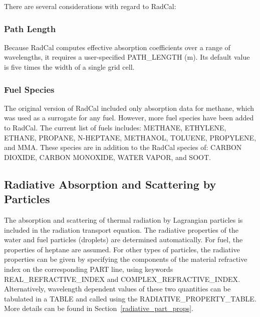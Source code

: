 \documentclass[11pt]{book}
\begin{document}
There are several considerations with regard to RadCal:

\subsubsection{Path Length}

Because RadCal computes effective absorption coefficients over a range of wavelengths, it requires a user-specified {\ct PATH\_LENGTH} (m).
Its default value is five times the width of a single grid cell.

\subsubsection{Fuel Species}

\label{info:RadCal_fuelspecies}

The original version of RadCal included only absorption data for methane, which was used as a surrogate for any fuel. However, more fuel species have been added to RadCal. The current list of fuels includes: {\ct METHANE}, {\ct ETHYLENE}, {\ct ETHANE}, {\ct PROPANE}, {\ct N-HEPTANE}, {\ct METHANOL}, {\ct TOLUENE}, {\ct PROPYLENE}, and {\ct MMA}. These species are in addition to the RadCal species of: {\ct CARBON DIOXIDE}, {\ct CARBON MONOXIDE}, {\ct WATER VAPOR}, and {\ct SOOT}.



\subsection{Radiative Absorption and Scattering by Particles}

\label{info:RADI_Absorption}

The absorption and scattering of thermal radiation by Lagrangian particles is included in the radiation transport equation. The radiative properties of
the water and fuel particles (droplets) are determined automatically. For fuel, the properties of heptane are assumed. For other types of particles, the
radiative properties can be given by specifying the components of the material refractive index on the corresponding {\ct PART} line, using keywords
{\ct REAL\_REFRACTIVE\_INDEX} and {\ct COMPLEX\_REFRACTIVE\_INDEX}. Alternatively, wavelength dependent values of these two
quantities can be tabulated in a {\ct TABLE} and called using the {\ct RADIATIVE\_PROPERTY\_TABLE}. More details can be found in Section~\ref{radiative_part_props}.
\end{document}
